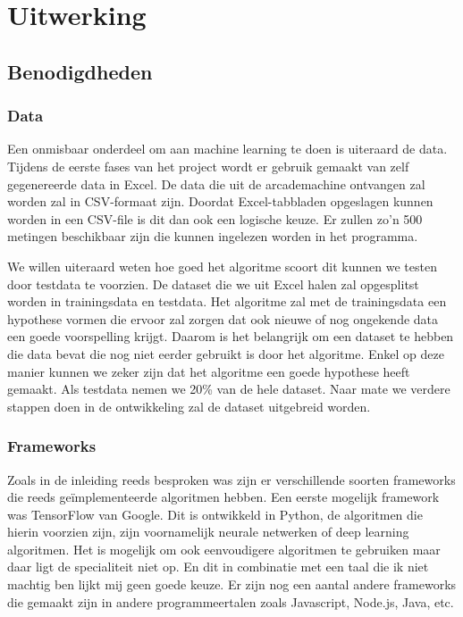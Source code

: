 
\chapter{Uitwerking}
\label{ch:uitwerking}


\section{Benodigdheden}
\label{sec:Benodigdheden}

\subsection{Data}
Een onmisbaar onderdeel om aan machine learning te doen is uiteraard de data. Tijdens de eerste fases van het project wordt er gebruik gemaakt van zelf gegenereerde data in Excel. De data die uit de arcademachine ontvangen zal worden zal in CSV-formaat zijn. Doordat Excel-tabbladen opgeslagen kunnen worden in een CSV-file is dit dan ook een logische keuze. 
Er zullen zo'n 500 metingen beschikbaar zijn die kunnen ingelezen worden in het programma. 

We willen uiteraard weten hoe goed het algoritme scoort dit kunnen we testen door testdata te voorzien. De dataset die we uit Excel halen zal opgesplitst worden in trainingsdata en testdata. Het algoritme zal met de trainingsdata een hypothese vormen die ervoor zal zorgen dat ook nieuwe of nog ongekende data een goede voorspelling krijgt. Daarom is het belangrijk om een dataset te hebben die data bevat die nog niet eerder gebruikt is door het algoritme. Enkel op deze manier kunnen we zeker zijn dat het algoritme een goede hypothese heeft gemaakt. Als testdata nemen we 20\% van de hele dataset. Naar mate we verdere stappen doen in de ontwikkeling zal de dataset uitgebreid worden. 

\subsection{Frameworks}
Zoals in de inleiding reeds besproken was zijn er verschillende soorten frameworks die reeds geïmplementeerde algoritmen hebben. Een eerste mogelijk framework was TensorFlow van Google. Dit is ontwikkeld in Python, de algoritmen die hierin voorzien zijn, zijn voornamelijk neurale netwerken of deep learning algoritmen. Het is mogelijk om ook eenvoudigere algoritmen te gebruiken maar daar ligt de specialiteit niet op. En dit in combinatie met een taal die ik niet machtig ben lijkt mij geen goede keuze. Er zijn nog een aantal andere frameworks die gemaakt zijn in andere programmeertalen zoals Javascript, Node.js, Java, etc. 

